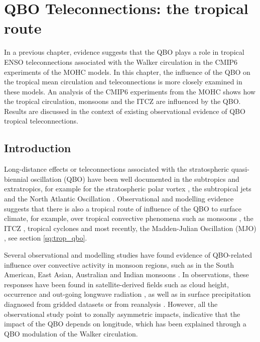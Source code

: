 \chapter{\label{ch:7-qbo} QBO Teleconnections: the tropical route }

In a previous chapter, evidence suggests that the QBO plays a role in tropical ENSO teleconnections associated with the Walker circulation in the CMIP6 experiments of the MOHC models.
In this chapter, the influence of the QBO on the tropical mean circulation and teleconnections is more closely examined in these models. An analysis of the CMIP6 experiments from the MOHC shows  how the tropical circulation, monsoons and the ITCZ are influenced by the QBO. Results are discussed in the context of existing observational evidence of QBO tropical teleconnections. 


\section{Introduction}

Long-distance effects or teleconnections associated with the stratospheric quasi-biennial oscillation (QBO) have been well documented in the subtropics and extratropics, for example for the stratospheric polar vortex \citep{holton1980,anstey2014,lu2020}, the subtropical jets \citep{garfinkel2011,hansen2016tropospheric} and the North Atlantic Oscillation \citep{hansen2016tropospheric,gray2018,andrews2019observed}.  
 Observational and modelling evidence suggests that there is also a tropical route of influence of the QBO to surface climate, for example, over tropical convective phenomena such as monsoons \citep{giorgetta1999,liess2012}, the ITCZ \citep{gray2018}, tropical cyclones \citep{gray1984,chan1995} and most recently, the Madden-Julian Oscillation (MJO) \citep{lee2018,wang2019,martin2020jgr}, see section \ref{sq:trop_qbo}. 
 
Several observational and modelling studies have found evidence of QBO-related influence over convective activity in monsoon regions, such as in the South American, East Asian, Australian and Indian monsoons \citep{giorgetta1999,collimore2003,liess2012,gray2018}. 
In observations, these responses have been found in satellite-derived fields such as cloud height, occurrence and out-going longwave radiation \citep{collimore2003,liess2012}, as well as in surface precipitation diagnosed from gridded datasets or from reanalysis \citep{gray2018}.
However, all the observational study point to zonally asymmetric impacts, indicative that the impact of the QBO depends on longitude, which has been explained \citep[e.g. by][]{collimore2003,liess2012} through a QBO modulation of the Walker circulation.

